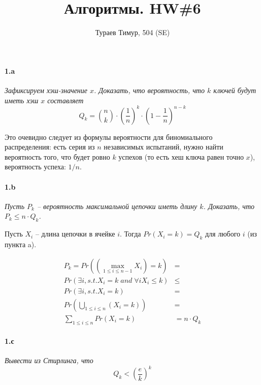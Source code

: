 \documentclass[russian]{article}
\begin{document}
\title{Алгоритмы. HW\#6}
\author{Тураев Тимур, 504 (SE)}
\maketitle

\paragraph*{1.a}

\textit{Зафиксируем хэш-значение $x$. Доказать, что вероятность, что $k$ ключей будут иметь хэш $x$ составляет
\[
Q_k = {n \choose k} \cdot \left(\frac{1}n\right)^{k} \cdot \left(1 - \frac{1}n\right)^{n-k}
\]
}


Это очевидно следует из формулы вероятности для биномиального распределения: есть серия из $n$ независимых испытаний, нужно найти вероятность того, что будет ровно $k$ успехов (то есть хеш ключа равен точно $x$), вероятность успеха: $1/n$.

\paragraph*{1.b}

\textit{Пусть $P_k$ – вероятность максимальной цепочки иметь длину $k$.  Доказать, что $P_k \leqslant n \cdot Q_k$.}

Пусть $X_i$ -- длина цепочки в ячейке $i$. Тогда $Pr(X_i = k) = Q_k$ для любого $i$ (из пункта a).

\begin{eqnarray*}
P_k = Pr\left(\left(\max_{1 \leqslant i \leqslant n-1} X_i\right) = k\right) & = \\
Pr(\exists i, s.t. X_i = k \; and \; \forall i X_i \leqslant k) & \leqslant \\
Pr(\exists i, s.t. X_i = k) & = \\
Pr(\bigcup_{1 \leqslant i \leqslant n} (X_i = k)) & = \\
\sum_{1 \leqslant i \leqslant n}{Pr(X_i = k)} & = n \cdot Q_k
\end{eqnarray*}

\paragraph*{1.с}

\textit{Вывести из Стирлинга, что
\[
Q_k < \left(\frac{e}{k}\right)^{k}
\]
}
\end{document}
